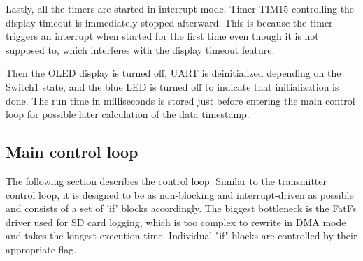 Lastly, all the timers are started in interrupt mode. Timer TIM15 controlling the display timeout is immediately stopped afterward. This is because the timer triggers an interrupt when started for the first time even though it is not supposed to, which interferes with the display timeout feature.

Then the OLED display is turned off, UART is deinitialized depending on the Switch1 state, and the blue LED is turned off to indicate that initialization is done. The run time in milliseconds is stored just before entering the main control loop for possible later calculation of the data timestamp.

\subsection{Main control loop}
The following section describes the control loop. Similar to the transmitter control loop, it is designed to be as non-blocking and interrupt-driven as possible and consists of a set of 'if' blocks accordingly. The biggest bottleneck is the FatFs driver used for SD card logging, which is too complex to rewrite in DMA mode and takes the longest execution time. Individual "if" blocks are controlled by their appropriate flag.

